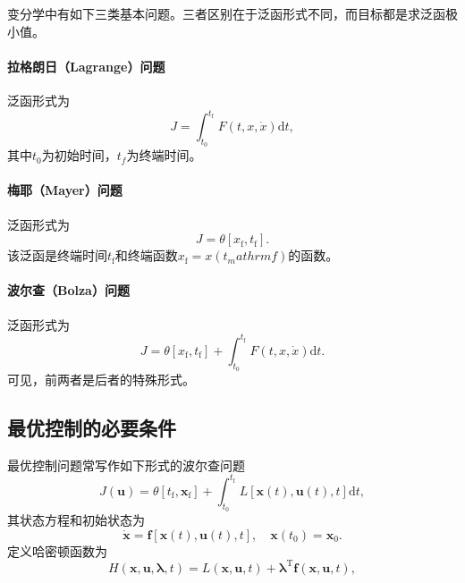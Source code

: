 变分学中有如下三类基本问题。三者区别在于泛函形式不同，而目标都是求泛函极小值。
\paragraph{拉格朗日（Lagrange）问题} 泛函形式为
\begin{equation}
J = \int_{t_0}^{t_\mathrm{f}}F(t,x,\dot{x})\mathrm{d}t,
\end{equation}
其中$t_0$为初始时间，$t_f$为终端时间。
\paragraph{梅耶（Mayer）问题} 泛函形式为
\begin{equation}
J=\theta[x_\mathrm{f},t_\mathrm{f}].
\end{equation}
该泛函是终端时间$t_\mathrm{f}$和终端函数$x_\mathrm{f}=x(t_mathrm{f})$的函数。
\paragraph{波尔查（Bolza）问题} 泛函形式为
\begin{equation}
J=\theta[x_\mathrm{f},t_\mathrm{f}]+\int_{t_0}^{t_\mathrm{f}}F(t,x,\dot{x})\mathrm{d}t.
\end{equation}
可见，前两者是后者的特殊形式。

\subsection{最优控制的必要条件}
最优控制问题常写作如下形式的波尔查问题
\begin{equation}
J(\bm{u})=\theta[t_\mathrm{f},\bm{x}_\mathrm{f}]+\int_{t_0}^{t_\mathrm{f}}L[\bm{x}(t),\bm{u}(t),t]\mathrm{d}t,
\end{equation}
其状态方程和初始状态为
\begin{equation}
\dot{\bm{x}}=\bm{f}[\bm{x}(t),\bm{u}(t),t], \quad \bm{x}(t_0)=\bm{x}_0.
\end{equation}
定义{\heiti 哈密顿函数}为
\begin{equation}
H(\bm{x},\bm{u},\bm{\lambda},t)=L(\bm{x},\bm{u},t)+\bm{\lambda}^\mathrm{T}\bm{f}(\bm{x},\bm{u},t),
\end{equation}

